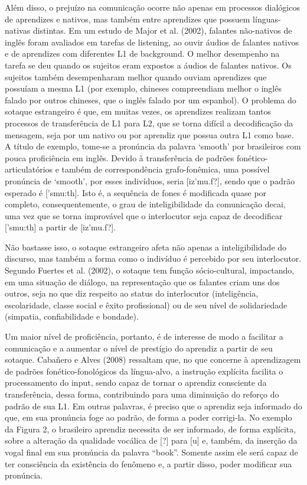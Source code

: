 Al\'em disso, o preju\'izo na comunica\c{c}\~ao ocorre n\~ao apenas em processos
dial\'ogicos de aprendizes e nativos, mas tamb\'em entre aprendizes que
possuem l\'inguas-nativas distintas. Em um estudo de Major et al. (2002),
falantes n\~ao-nativos de ingl\^es foram avaliados em tarefas de listening,
ao ouvir \'audios de falantes nativos e de aprendizes com diferentes L1 de
background. O melhor desempenho na tarefa se deu quando os sujeitos eram
expostos a \'audios de falantes nativos. Os sujeitos tamb\'em desempenharam
melhor quando ouviam aprendizes que possu\'iam a mesma L1 (por exemplo,
chineses compreendiam melhor o ingl\^es falado por outros chineses, que o
ingl\^es falado por um espanhol). O problema do sotaque estrangeiro \'e que,
em muitas vezes, os aprendizes realizam tantos processos de
transfer\^encia de L1 para L2, que se torna dif\'icil a decodifica\c{c}\~ao da
mensagem, seja por um nativo ou por aprendiz que possua outra L1 como
base. A t\'itulo de exemplo, tome-se a pron\'uncia da palavra `smooth' por
brasileiros com pouca profici\^encia em ingl\^es. Devido à transfer\^encia de
padr\~oes fon\'etico-articulat\'orios e tamb\'em de correspond\^encia
grafo-fon\^emica, uma poss\'ivel pron\'uncia de `smooth', por esses
indiv\'iduos, seria {[}iz'mu.f?{]}, sendo que o padr\~ao esperado \'e
{[}'smu:th{]}. Isto \'e, a sequ\^encia de fones \'e modificada quase por
completo, consequentemente, o grau de inteligibilidade da comunica\c{c}\~ao
decai, uma vez que se torna improv\'avel que o interlocutor seja capaz de
decodificar {[}'smu:th{]} a partir de {[}iz'mu.f?{]}.

N\~ao bastasse isso, o sotaque estrangeiro afeta n\~ao apenas a
inteligibilidade do discurso, mas tamb\'em a forma como o indiv\'iduo \'e
percebido por seu interlocutor. Segundo Fuertes et al. (2002), o sotaque
tem fun\c{c}\~ao s\'ocio-cultural, impactando, em uma situa\c{c}\~ao de di\'alogo, na
representa\c{c}\~ao que os falantes criam uns dos outros, seja no que diz
respeito ao status do interlocutor (intelig\^encia, escolaridade, classe
social e \^exito profissional) ou de seu n\'ivel de solidariedade (simpatia,
confiabilidade e bondade).

Um maior n\'ivel de profici\^encia, portanto, \'e de interesse de modo a
facilitar a comunica\c{c}\~ao e a aumentar o n\'ivel de prest\'igio do aprendiz a
partir de seu sotaque. Caba\~nero e Alves (2008) ressaltam que, no que
concerne à aprendizagem de padr\~oes fon\'etico-fonol\'ogicos da l\'ingua-alvo,
a instru\c{c}\~ao expl\'icita facilita o processamento do input, sendo capaz de
tornar o aprendiz consciente da transfer\^encia, dessa forma, contribuindo
para uma diminui\c{c}\~ao do refor\c{c}o do padr\~ao de sua L1. Em outras palavras,
\'e preciso que o aprendiz seja informado do que, em sua pron\'uncia foge ao
padr\~ao, de forma a poder corrigi-la. No exemplo da Figura 2, o
brasileiro aprendiz necessita de ser informado, de forma expl\'icita,
sobre a altera\c{c}\~ao da qualidade voc\'alica de {[}?{]} para {[}u{]} e,
tamb\'em, da inser\c{c}\~ao da vogal final em sua pron\'uncia da palavra ``book''.
Somente assim ele ser\'a capaz de ter consci\^encia da exist\^encia do
fen\^omeno e, a partir disso, poder modificar sua pron\'uncia.

